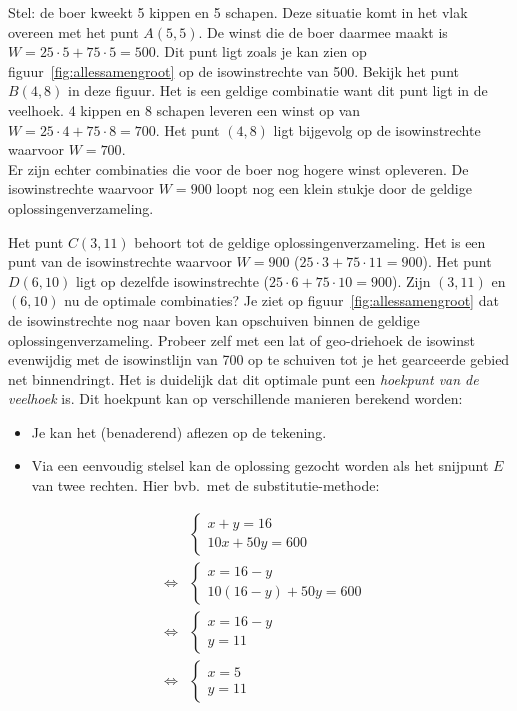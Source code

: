 Stel: de boer
kweekt 5 kippen   en 5 schapen. Deze situatie komt in het vlak overeen met het punt $A(5,5)$. De winst die
de boer daarmee maakt is  $W = 25\cdot 5 + 75\cdot 5 = 500$.
Dit punt ligt zoals je kan zien op figuur~\ref{fig:allessamengroot} op de isowinstrechte
van 500. Bekijk het punt $B(4, 8)$ in deze
figuur.
Het is een geldige combinatie
want dit punt ligt in de veelhoek. 4 kippen en 8 schapen leveren
een winst op van $W = 25\cdot 4 + 75\cdot 8 = 700$.
Het punt $(4, 8)$ ligt bijgevolg op de isowinstrechte waarvoor $W=700$.\\
Er zijn echter combinaties die voor de boer nog hogere winst
opleveren. De isowinstrechte waarvoor $W= 900$ loopt nog
een klein stukje door de geldige oplossingenverzameling.

Het punt $C(3,11)$ behoort  tot de geldige oplossingenverzameling.
Het is een punt van de isowinstrechte waarvoor $W= 900$ ($ 25\cdot
3 + 75\cdot11=900$). Het punt $D(6,10)$ ligt op dezelfde isowinstrechte ($25\cdot 6+75\cdot 10=900$). 
Zijn $(3, 11)$ en $(6, 10)$ nu de optimale combinaties?
Je ziet op figuur~\ref{fig:allessamengroot} dat de isowinstrechte nog naar boven
kan opschuiven binnen de geldige oplossingenverzameling. Probeer zelf met een lat of geo-driehoek
de isowinst evenwijdig met de isowinstlijn van 700 op te
schuiven tot je het gearceerde gebied net binnendringt.
Het is duidelijk dat dit optimale punt een \emph{hoekpunt van de
veelhoek} is.
Dit hoekpunt kan op verschillende manieren berekend worden:

\begin{itemize}
    \item  Je kan het (benaderend) aflezen op de tekening.

    \item  Via een eenvoudig stelsel kan de oplossing gezocht worden als het
snijpunt $E$ van twee rechten. Hier bvb.\ met de substitutie-methode:
\end{itemize}
\begin{eqnarray*}
     &  &
    \left\{\begin{array}{l}
         x+y=16  \\
         10x+50y=600
     \end{array}
     \right.
       \\
     & \Leftrightarrow &  \left\{\begin{array}{l}
         x=16-y  \\
         10(16-y)+50y=600
     \end{array}
     \right. \\
     & \Leftrightarrow & \left\{\begin{array}{l}
         x=16-y  \\
         y=11
     \end{array}
     \right.  \\
     & \Leftrightarrow & \left\{\begin{array}{l}
         x=5  \\
         y=11
     \end{array}
     \right.
\end{eqnarray*}



